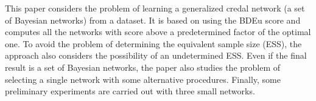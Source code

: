 
This paper considers the problem of learning a  generalized credal network (a set of Bayesian networks) from a dataset. It is based on using the BDEu score and computes all the networks with score above a predetermined factor of the optimal one. To avoid the problem of determining the equivalent sample size (ESS), the approach also considers the possibility of an undetermined ESS. Even if the final result is a set of Bayesian networks, the paper also studies the problem of selecting a single network with some alternative procedures. Finally, some preliminary experiments are carried out with three small networks. 


